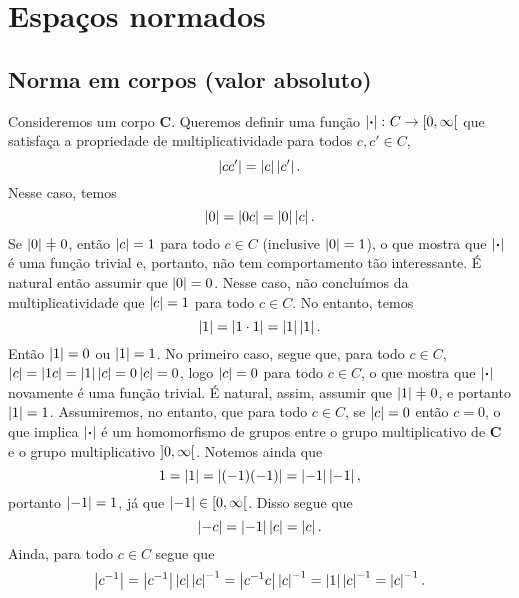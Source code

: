 \chapter{Espaços normados}

\section{Norma em corpos (valor absoluto)}

Consideremos um corpo $\bm C$. Queremos definir uma função $\left\vert{\bm{\cdot}}\right\vert\colon C \to \left[{0},{\infty}\right[$ que satisfaça a propriedade de multiplicatividade para todos $c,c' \in C$,
	\begin{equation*}
	\left\vert{cc'}\right\vert = \left\vert{c}\right\vert\left\vert{c'}\right\vert.
	\end{equation*}
Nesse caso, temos
	\begin{equation*}
	\left\vert{0}\right\vert=\left\vert{0c}\right\vert = \left\vert{0}\right\vert\left\vert{c}\right\vert.
	\end{equation*}
Se $\abs{0} \neq 0$, então $\left\vert{c}\right\vert=1$ para todo $c \in C$ (inclusive $\left\vert{0}\right\vert=1$), o que mostra que $\left\vert{\bm{\cdot}}\right\vert$ é uma função trivial e, portanto, não tem comportamento tão interessante. É natural então assumir que $\left\vert{0}\right\vert=0$. Nesse caso, não concluímos da multiplicatividade que $\left\vert{c}\right\vert=1$ para todo $c \in C$. No entanto, temos
	\begin{equation*}
	\left\vert{1}\right\vert = \left\vert{1 \cdot 1}\right\vert = \left\vert{1}\right\vert\left\vert{1}\right\vert.
	\end{equation*}
Então $\left\vert{1}\right\vert=0$ ou $\left\vert{1}\right\vert=1$. No primeiro caso, segue que, para todo $c \in C$, $\left\vert{c}\right\vert = \left\vert{1c}\right\vert = \left\vert{1}\right\vert\left\vert{c}\right\vert = 0 \left\vert{c}\right\vert = 0$, logo $\left\vert{c}\right\vert = 0$ para todo $c \in C$, o que mostra que $\left\vert{\bm{\cdot}}\right\vert$ novamente é uma função trivial. É natural, assim, assumir que $\abs{1} \neq 0$, e portanto $\left\vert{1}\right\vert=1$. Assumiremos, no entanto, que para todo $c \in C$, se $\left\vert{c}\right\vert = 0$ então $c=0$, o que implica $\left\vert{\bm{\cdot}}\right\vert$ é um homomorfismo de grupos entre o grupo multiplicativo de $\bm C$ e o grupo multiplicativo $\left]{0},{\infty}\right[$.
Notemos ainda que
	\begin{equation*}
	1 = \left\vert{1}\right\vert = \left\vert{(-1)(-1)}\right\vert = \left\vert{-1}\right\vert\left\vert{-1}\right\vert,
	\end{equation*}
portanto $\left\vert{-1}\right\vert = 1$, já que $\left\vert{-1}\right\vert \in \left[{0},{\infty}\right[$. Disso segue que
	\begin{equation*}
	\left\vert{-c}\right\vert = \left\vert{-1}\right\vert\left\vert{c}\right\vert=\left\vert{c}\right\vert.
	\end{equation*}
Ainda, para todo $c \in C$ segue que
	\begin{equation*}
	\left\vert{c^{-1}}\right\vert = \left\vert{c^{-1}}\right\vert\left\vert{c}\right\vert\left\vert{c}\right\vert^{-1} = \left\vert{c^{-1}c}\right\vert\left\vert{c}\right\vert^{-1} = \left\vert{1}\right\vert\left\vert{c}\right\vert^{-1} = \left\vert{c}\right\vert^{-1}.
	\end{equation*}

